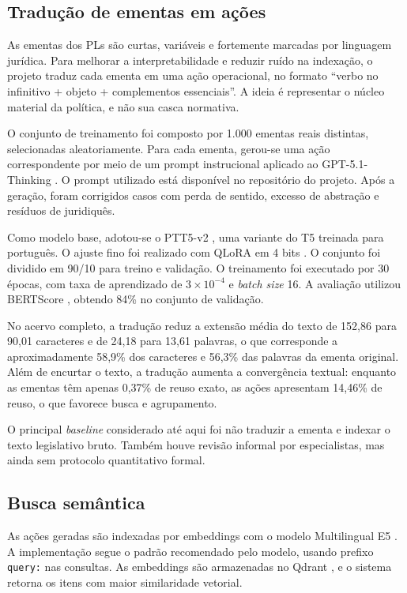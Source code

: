 \subsection{Tradução de ementas em ações}

As ementas dos PLs são curtas, variáveis e fortemente marcadas por linguagem jurídica. Para melhorar a interpretabilidade e reduzir ruído na indexação, o projeto traduz cada ementa em uma ação operacional, no formato ``verbo no infinitivo + objeto + complementos essenciais''. A ideia é representar o núcleo material da política, e não sua casca normativa.

O conjunto de treinamento foi composto por 1.000 ementas reais distintas, selecionadas aleatoriamente. Para cada ementa, gerou-se uma ação correspondente por meio de um prompt instrucional aplicado ao GPT-5.1-Thinking \cite{openai_gpt51_model,openai_gpt51_system_card}. O prompt utilizado está disponível no repositório do projeto. Após a geração, foram corrigidos casos com perda de sentido, excesso de abstração e resíduos de juridiquês.

Como modelo base, adotou-se o PTT5-v2 \cite{piau_ptt5v2_2024}, uma variante do T5 \cite{raffel_t5_2020} treinada para português. O ajuste fino foi realizado com QLoRA em 4 bits \cite{dettmers_qlora_2023}. O conjunto foi dividido em 90/10 para treino e validação. O treinamento foi executado por 30 épocas, com taxa de aprendizado de $3\times 10^{-4}$ e \textit{batch size} 16. A avaliação utilizou BERTScore \cite{zhang_bertscore_2019}, obtendo 84\% no conjunto de validação.

No acervo completo, a tradução reduz a extensão média do texto de 152,86 para 90,01 caracteres e de 24,18 para 13,61 palavras, o que corresponde a aproximadamente 58,9\% dos caracteres e 56,3\% das palavras da ementa original. Além de encurtar o texto, a tradução aumenta a convergência textual: enquanto as ementas têm apenas 0,37\% de reuso exato, as ações apresentam 14,46\% de reuso, o que favorece busca e agrupamento.

O principal \textit{baseline} considerado até aqui foi não traduzir a ementa e indexar o texto legislativo bruto. Também houve revisão informal por especialistas, mas ainda sem protocolo quantitativo formal.

\subsection{Busca semântica}

As ações geradas são indexadas por embeddings com o modelo Multilingual E5 \cite{wang_e5_2024}. A implementação segue o padrão recomendado pelo modelo, usando prefixo \texttt{query:} nas consultas. As embeddings são armazenadas no Qdrant \cite{qdrant_overview,qdrant_collections}, e o sistema retorna os itens com maior similaridade vetorial.

